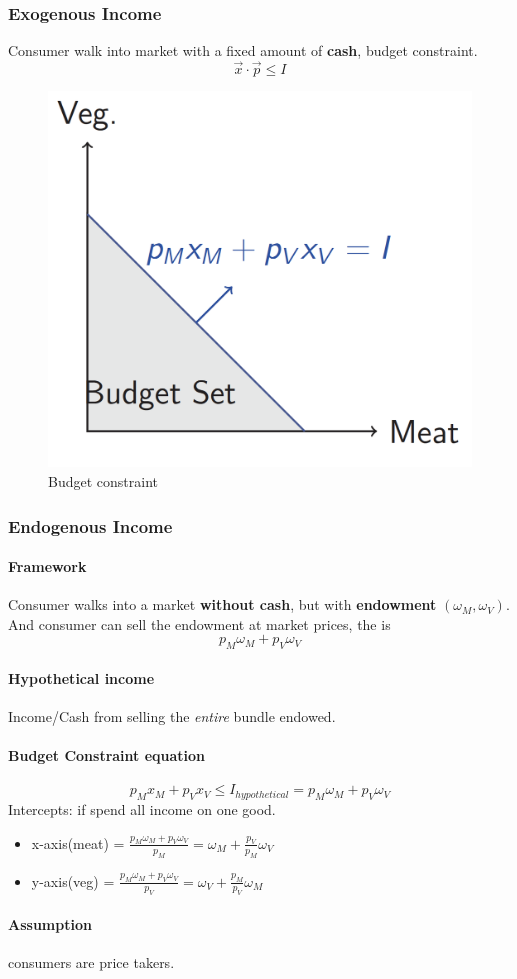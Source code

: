 \documentclass{article}
\begin{document}
	\subsubsection{Exogenous Income} Consumer walk into market with a fixed amount of \textbf{cash}, budget constraint.
	\[
	\vec{x} \cdot \vec{p} \leq I
	\]
	\begin{figure}[h]
		\centering
		\includegraphics[width=0.3\linewidth]{eco206pic/budget}
		\caption{Budget constraint}
	\end{figure}
	
	\subsubsection{Endogenous Income}
	\paragraph{Framework} Consumer walks into a market \textbf{without cash}, but with \textbf{endowment} $(\omega_M, \omega_V)$. And consumer can sell the endowment at market prices, the  is
	\[
		p_M \omega_M + p_V \omega_V
	\]
	\paragraph{Hypothetical income} Income/Cash from selling the \emph{entire} bundle endowed. 
	\paragraph{Budget Constraint equation}
	\[
		p_M x_M + p_V x_V \leq I_{hypothetical} = p_M \omega_M + p_V \omega_V
	\]
	Intercepts: if spend all income on one good.
	\begin{itemize}
		\item x-axis(meat) = $\frac{p_M \omega_M + p_V \omega_V}{p_M} = \omega_M + \frac{p_V}{p_M}\omega_V$
		\item y-axis(veg) = $\frac{p_M \omega_M + p_V \omega_V}{p_V} = \omega_V + \frac{p_M}{p_V}\omega_M$
	\end{itemize}
	\paragraph{Assumption} consumers are price takers.
\end{document}
